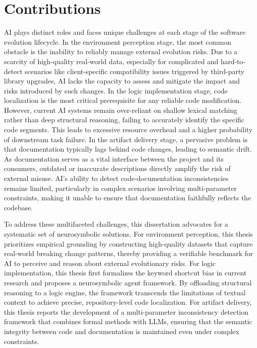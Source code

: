 \section{Contributions}\label{sec:contribution}
AI plays distinct roles and faces unique challenges at each stage of the software evolution lifecycle. In the environment perception stage, the most common obstacle is the inability to reliably manage external evolution risks. Due to a scarcity of high-quality real-world data, especially for complicated and hard-to-detect scenarios like client-specific compatibility issues triggered by third-party library upgrades, AI lacks the capacity to assess and mitigate the impact and risks introduced by such changes. In the logic implementation stage, code localization is the most critical prerequisite for any reliable code modification. However, current AI systems remain over-reliant on shallow lexical matching rather than deep structural reasoning, failing to accurately identify the specific code segments. This leads to excessive resource overhead and a higher probability of downstream task failure. In the artifact delivery stage, a pervasive problem is that documentation typically lags behind code changes, leading to semantic drift. As documentation serves as a vital interface between the project and its consumers, outdated or inaccurate descriptions directly amplify the risk of external misuse. AI's ability to detect code-documentation inconsistencies remains limited, particularly in complex scenarios involving multi-parameter constraints, making it unable to ensure that documentation faithfully reflects the codebase.

To address these multifaceted challenges, this dissertation advocates for a systematic set of neurosymbolic solutions. For environment perception, this thesis prioritizes empirical grounding by constructing high-quality datasets that capture real-world breaking change patterns, thereby providing a verifiable benchmark for AI to perceive and reason about external evolutionary risks. For logic implementation, this thesis first formalizes the keyword shortcut bias in current research and proposes a neurosymbolic agent framework. By offloading structural reasoning to a logic engine, the framework transcends the limitations of textual context to achieve precise, repository-level code localization. For artifact delivery, this thesis reports the development of a multi-parameter inconsistency detection framework that combines formal methods with LLMs, ensuring that the semantic integrity between code and documentation is maintained even under complex constraints.

